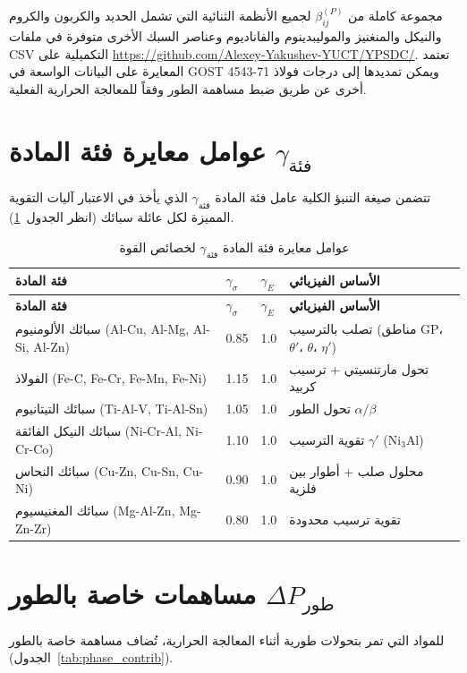 \documentclass[12pt,a4paper]{article}
\begin{document}
	مجموعة كاملة من \(\beta_{ij}^{(P)}\) لجميع الأنظمة الثنائية التي تشمل الحديد والكربون والكروم والنيكل والمنغنيز والموليبدينوم والفاناديوم وعناصر السبك الأخرى متوفرة في ملفات CSV التكميلية على \url{https://github.com/Alexey-Yakushev-YUCT/YPSDC/}. تعتمد المعايرة على البيانات الواسعة في GOST 4543-71 ويمكن تمديدها إلى درجات فولاذ أخرى عن طريق ضبط مساهمة الطور وفقاً للمعالجة الحرارية الفعلية.
	
	\section{عوامل معايرة فئة المادة \(\gamma_{\text{فئة}}\)}
	تتضمن صيغة التنبؤ الكلية عامل فئة المادة \(\gamma_{\text{فئة}}\) الذي يأخذ في الاعتبار آليات التقوية المميزة لكل عائلة سبائك (انظر الجدول~\ref{tab:gamma_class}).
	
	\begin{longtable}{p{3.5cm} p{2.5cm} p{2.5cm} p{5cm}}
		\caption{عوامل معايرة فئة المادة \(\gamma_{\text{فئة}}\) لخصائص القوة}\label{tab:gamma_class}\\
		\toprule
		\textbf{فئة المادة} & \(\gamma_{\sigma}\) & \(\gamma_{E}\) & \textbf{الأساس الفيزيائي} \\
		\midrule
		\endfirsthead
		\toprule
		\textbf{فئة المادة} & \(\gamma_{\sigma}\) & \(\gamma_{E}\) & \textbf{الأساس الفيزيائي} \\
		\midrule
		\endhead
		سبائك الألومنيوم (Al-Cu, Al-Mg, Al-Si, Al-Zn) & 0.85 & 1.0 & تصلب بالترسيب (مناطق GP، \(\theta'\)، \(\theta\)، \(\eta'\)) \\
		الفولاذ (Fe-C, Fe-Cr, Fe-Mn, Fe-Ni) & 1.15 & 1.0 & تحول مارتنسيتي + ترسيب كربيد \\
		سبائك التيتانيوم (Ti-Al-V, Ti-Al-Sn) & 1.05 & 1.0 & تحول الطور \(\alpha/\beta\) \\
		سبائك النيكل الفائقة (Ni-Cr-Al, Ni-Cr-Co) & 1.10 & 1.0 & تقوية الترسيب \(\gamma'\) (Ni\(_3\)Al) \\
		سبائك النحاس (Cu-Zn, Cu-Sn, Cu-Ni) & 0.90 & 1.0 & محلول صلب + أطوار بين فلزية \\
		سبائك المغنيسيوم (Mg-Al-Zn, Mg-Zn-Zr) & 0.80 & 1.0 & تقوية ترسيب محدودة \\
		\bottomrule
	\end{longtable}
	
	\section{مساهمات خاصة بالطور \(\Delta P_{\text{طور}}\)}
	للمواد التي تمر بتحولات طورية أثناء المعالجة الحرارية، تُضاف مساهمة خاصة بالطور (الجدول~\ref{tab:phase_contrib}).
	
\end{document}
